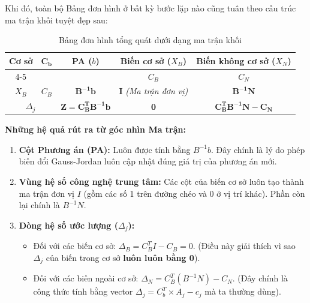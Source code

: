 Khi đó, toàn bộ Bảng đơn hình ở bất kỳ bước lặp nào cũng tuân theo cấu trúc ma trận khối tuyệt đẹp sau:

\begin{table}[H]
    \centering
    \renewcommand{\arraystretch}{2} %
    \begin{tabular}{|c|c|c|c|c|}
        \hline
        \multirow{2}{*}{\textbf{Cơ sở}} & \multirow{2}{*}{$\mathbf{C_b}$} & \multirow{2}{*}{\textbf{PA ($b$)}} & \textbf{Biến cơ sở} ($X_B$) & \textbf{Biến không cơ sở} ($X_N$) \\
        \cline{4-5}
        & & & $C_B$ & $C_N$ \\
        \hline
        $X_B$ & $C_B$ & $\mathbf{B^{-1}b}$ & $\mathbf{I}$ \textit{(Ma trận đơn vị)} & $\mathbf{B^{-1}N}$ \\
        \hline
        \multicolumn{2}{|c|}{$\Delta_j$} & $\mathbf{Z = C_B^T B^{-1}b}$ & $\mathbf{0}$ & $\mathbf{C_B^T B^{-1}N - C_N}$ \\
        \hline
    \end{tabular}
    \caption{Bảng đơn hình tổng quát dưới dạng ma trận khối}
    \label{tab:matrix_simplex}
\end{table}

\textbf{Những hệ quả rút ra từ góc nhìn Ma trận:}
\begin{enumerate}
    \item \textbf{Cột Phương án (PA):} Luôn được tính bằng $B^{-1}b$. Đây chính là lý do phép biến đổi Gauss-Jordan luôn cập nhật đúng giá trị của phương án mới.
    \item \textbf{Vùng hệ số công nghệ trung tâm:} Các cột của biến cơ sở luôn tạo thành ma trận đơn vị $I$ (gồm các số 1 trên đường chéo và 0 ở vị trí khác). Phần còn lại chính là $B^{-1}N$.
    \item \textbf{Dòng hệ số ước lượng ($\Delta_j$):} 
    \begin{itemize}
        \item Đối với các biến cơ sở: $\Delta_B = C_B^T I - C_B = 0$. (Điều này giải thích vì sao $\Delta_j$ của biến trong cơ sở \textbf{luôn luôn bằng 0}).
        \item Đối với các biến ngoài cơ sở: $\Delta_N = C_B^T (B^{-1}N) - C_N$. (Đây chính là công thức tính bằng vector $\Delta_j = C_b^T \times A_j - c_j$ mà ta thường dùng).
    \end{itemize}
\end{enumerate}

